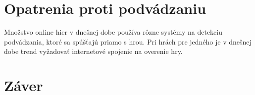 \documentclass[10pt,twoside,slovak,a4paper]{article}
\begin{document}




\section{Opatrenia proti podvádzaniu}

Množstvo online hier v dnešnej dobe používa rôzne systémy na detekciu podvádzania, ktoré sa spúšťajú priamo s hrou. Pri hrách pre jedného je v dnešnej dobe trend vyžadovať internetové spojenie na overenie hry.
\section{Záver} \label{zaver} %






\end{document}
